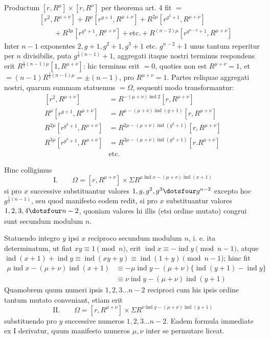 Productum $[r,R^\mu]\times[r,R^\nu]$ per theorema art. 4 fit $=$
\[
\begin{aligned}
&[r^2,R^{\mu+\nu}]+R^\mu[r^{g+1},R^{\mu+\nu}]+R^{2\mu}[r^{g^2+1},R^{\mu+\nu}]\\
&\qquad+R^{3\mu}[r^{g^3+1},R^{\mu+\nu}]+\text{etc.}+R^{(n-2)\mu}[r^{g^{n-2}+1},R^{\mu+\nu}]
\end{aligned}
\]
Inter $n-1$ exponentes $2,g+1,g^2+1,g^3+1$ etc. $g^{n-2}+1$ unus tantum reperitur per $n$ divisibilis, puta $g^{\frac12(n-1)}+1$, aggregati itaque nostri terminus respondens erit $R^{\frac12(n-1)\mu}[1,R^{\mu+\nu}]$: hic terminus erit $=0$, quoties non est $R^{\mu+\nu}=1$, et $=(n-1)R^{\frac12(n-1)\mu}=\pm(n-1)$, pro $R^{\mu+\nu}=1$. Partes reliquae aggregati nostri, quarum summam statuemus $=\Omega$, sequenti modo transformantur:
\[
\begin{aligned}
[r^2,R^{\mu+\nu}]&=R^{-(\mu+\nu)\operatorname{ind}2}[r,R^{\mu+\nu}]\\
R^\mu[r^{g+1},R^{\mu+\nu}]&=R^{\mu-(\mu+\nu)\operatorname{ind}(g+1)}[r,R^{\mu+\nu}]\\
R^{2\mu}[r^{g^2+1},R^{\mu+\nu}]&=R^{2\mu-(\mu+\nu)\operatorname{ind}(g^2+1)}[r,R^{\mu+\nu}]\\
R^{3\mu}[r^{g^3+1},R^{\mu+\nu}]&=R^{3\mu-(\mu+\nu)\operatorname{ind}(g^3+1)}[r.R^{\mu+\nu}]\\
&\text{etc.}
\end{aligned}
\]

Hinc colligimus
\[
\text{I.}\qquad\Omega=[r,R^{\mu+\nu}]\times\Sigma R^{\mu\operatorname{ind}x-(\mu+\nu)\operatorname{ind}(x+1)}
\]
si pro $x$ successive substituantur valores $1,g,g^2,g^3\dotsfour g^{n-2}$ excepto hoc $g^{\frac12(n-1)}$, seu quod manifesto eodem redit, si pro $x$ substituantur valores $1,2,3,4\dotsfour n-2$, quoniam valores hi illis (etsi ordine mutato) congrui sunt secundum modulum $n$.

Statuendo integro $y$ ipsi $x$ reciproco secundum modulum $n$, i. e. ita determinatum, ut fiat $xy\equiv1\pmod n$, erit $\operatorname{ind}x\equiv-\operatorname{ind}y\pmod{n-1}$, atque $\operatorname{ind}(x+1)+\operatorname{ind}y\equiv\operatorname{ind}(xy+y)\equiv\operatorname{ind}(1+y)\pmod{n-1}$; hinc fit
\[
\begin{aligned}
\mu\operatorname{ind}x-(\mu+\nu)\operatorname{ind}(x+1)&\equiv-\mu\operatorname{ind}y-(\mu+\nu)\{\operatorname{ind}(y+1)-\operatorname{ind}y\}\\
&\equiv\nu\operatorname{ind}y-(\mu+\nu)\operatorname{ind}(y+1)
\end{aligned}
\]
Quamobrem quum numeri ipsis $1,2,3\dots n-2$ reciproci cum his ipsis ordine tantum mutato conveniant, etiam erit
\[
\text{II.}\qquad\Omega=[r,R^{\mu+\nu}]\times\Sigma R^{\nu\operatorname{ind}y-(\mu+\nu)\operatorname{ind}(y+1)}
\]
substituendo pro $y$ successive numeros $1,2,3\dots n-2$. Eadem formula immediate ex I derivatur, quum manifesto numeros $\mu,\nu$ inter se permutare liceat.

